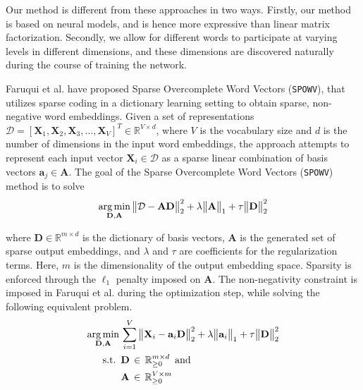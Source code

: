 \documentclass[letterpaper]{article} %
\begin{document}
Our method is different from these approaches in two ways. Firstly, our method is based on neural models, and is hence more expressive than linear matrix factorization. Secondly, we allow for different words to participate at varying levels in different dimensions, and these dimensions are discovered naturally during the course of training the network.

Faruqui et al.  have proposed Sparse Overcomplete Word Vectors (\texttt{SPOWV}), that utilizes sparse coding in a dictionary learning setting to obtain sparse, non-negative word embeddings.
Given a set of representations $\mathcal{D} = [\mathbf{X}_1, \mathbf{X}_2, \mathbf{X}_3, \dots, \mathbf{X}_V]^T \in \mathbb{R}^{V \times d}$, where $V$ is the vocabulary size and $d$ is the number of dimensions in the input word embeddings, the approach attempts to represent each input vector $\mathbf{X}_i \in \mathcal{D}$ as a sparse linear combination of basis vectors $\mathbf{a}_j \in \mathbf{A}$. The goal of the Sparse Overcomplete Word Vectors (\texttt{SPOWV}) method is to solve
\begin{align*}
	\operatornamewithlimits{arg\,min}_{\mathbf{D},\mathbf{A}} \big\lVert \mathcal{D} - \mathbf{A} \mathbf{D} \big\rVert_2^2 + \lambda \big\lVert\mathbf{A}\big\rVert_1 + \tau \big\lVert \mathbf{D} \big\rVert_2^2
\end{align*}

\noindent where $\mathbf{D} \in \mathbb{R}^{m \times d}$ is the dictionary of basis vectors, $\mathbf{A}$ is the generated set of sparse output embeddings, and $\lambda$ and $\tau$ are coefficients for the regularization terms. Here, $m$ is the dimensionality of the output embedding space. Sparsity is enforced through the $\ell_1$ penalty imposed on $\mathbf{A}$. The non-negativity constraint is imposed in Faruqui et al.  during the optimization step, while solving the following equivalent problem.
\begin{align*}
	\operatornamewithlimits{arg\,min}_{\mathbf{D}, \mathbf{A}} \,&\sum_{i=1}^{V} \big\lVert \mathbf{X}_i - \mathbf{a}_i\mathbf{D} \big\rVert_2^2 + \lambda \big\lVert \mathbf{a}_i \big\rVert_1 + \tau \big\lVert \mathbf{D} \big\rVert_2^2 \\
	\text{s.t.} ~\,&\mathbf{D} \,\in \,\mathbb{R}^{m \times d}_{\geq 0} \,~\text{and} \\ 
    &\mathbf{A} \,\in \,\mathbb{R}^{V \times m}_{\geq 0}
\end{align*}
\end{document}
